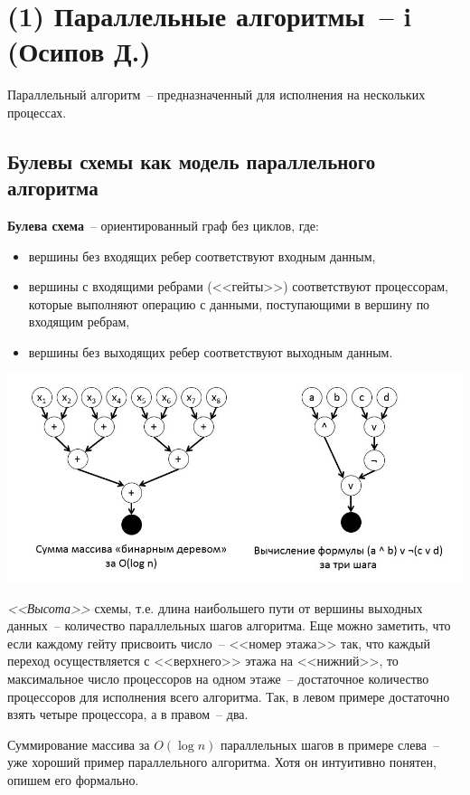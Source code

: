 \section{(1) Параллельные алгоритмы~-- i (Осипов Д.)}

Параллельный алгоритм~-- предназначенный для исполнения на нескольких процессах.
\subsection{Булевы схемы как модель параллельного алгоритма}
\begin{definition*}
	{\bfseries Булева схема}~-- ориентированный граф без циклов, где:
\begin{itemize}
    \item вершины без входящих ребер соответствуют входным данным,
    \item вершины с входящими ребрами (<<гейты>>) соответствуют процессорам, которые выполняют операцию с данными, поступающими в вершину по входящим ребрам,
    \item вершины без выходящих ребер соответствуют выходным данным.
\end{itemize}
\end{definition*}
\includegraphics[scale=0.5]{figures/boolex.jpg}

\textit{<<Высота>>} схемы, т.е. длина наибольшего пути от вершины выходных данных~-- количество параллельных шагов алгоритма. Еще можно заметить, что если каждому гейту присвоить число~-- <<номер этажа>> так, что каждый переход осуществляется с <<верхнего>> этажа на <<нижний>>, то максимальное число процессоров на одном этаже~-- достаточное количество процессоров для исполнения всего алгоритма. Так, в левом примере достаточно взять четыре процессора, а в правом~-- два.

Суммирование массива за $O(\log n)$ параллельных шагов в примере слева~-- уже хороший пример параллельного алгоритма. Хотя он интуитивно понятен, опишем его формально.

